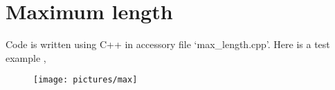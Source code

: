 \section{Maximum length}
Code is written using C++ in accessory file `max\_length.cpp'.
Here is a test example ,
\begin{figure}[H]
\centering
\texttt{[image: pictures/max]} 		
\end{figure}
